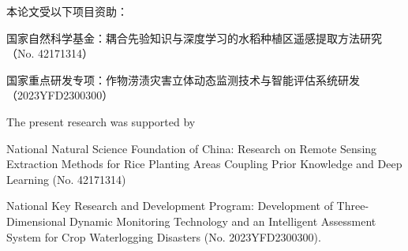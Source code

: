 \cleardoublepage
\thispagestyle{previous}

\begingroup
\linespread{1.15}\selectfont

\begin{center}
\vspace*{0.09\textheight}

{\songti{} 本论文受以下项目资助：}

\vspace{2.8em}

\begin{minipage}{0.86\textwidth}
\centering
\songti{}
国家自然科学基金：耦合先验知识与深度学习的水稻种植区遥感提取方法研究（No. 42171314）
\end{minipage}

\vspace{2.6em}

\begin{minipage}{0.86\textwidth}
\centering
\songti{}
国家重点研发专项：作物涝渍灾害立体动态监测技术与智能评估系统研发（2023YFD2300300）
\end{minipage}

\vspace{3.5em}

{ The present research was supported by}

\vspace{2.5em}

\begin{minipage}{0.86\textwidth}
\centering
{}
National Natural Science Foundation of China: Research on Remote Sensing Extraction Methods for Rice Planting Areas Coupling Prior
Knowledge and Deep Learning (No. 42171314)
\end{minipage}

\vspace{2.4em}

\begin{minipage}{0.86\textwidth}
\centering
{}
National Key Research and Development Program: Development of Three-Dimensional Dynamic Monitoring Technology and an Intelligent
Assessment System for Crop Waterlogging Disasters (No. 2023YFD2300300).
\end{minipage}

\end{center}

\endgroup
